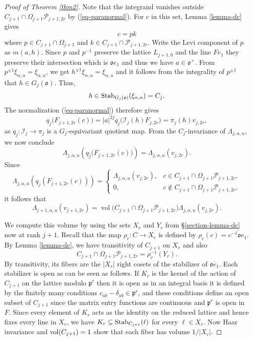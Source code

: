 \documentclass[12pt]{amsart}
\theoremstyle{definition}
\theoremstyle{remark}
\begin{document}
\begin{proof}[Proof of Theorem \ref{thm2}]
Note that the integrand vanishes outside 
$C_{j+1}\cap\Omega_{j+1}\mathcal P_{j+1,2r}$ by (\ref{eq-paranormal}).
For $c$ in this set, Lemma \ref{lemma-dc} gives
\[
c=pk\]
where
$
p\in C_{j+1}\cap\Omega_{j+1}$ and $k\in C_{j+1}\cap\mathcal P_{j+1,2r}$.
Write the Levi component of $p$ as $m(a,h)$. Since $p$ and $p^{-1}$ preserve the lattice $L_{j+1,0}$ and the line $Fe_1$ they preserve their intersection which is $\mathfrak o e_1$ and thus we have $a\in\mathfrak o^\times$. From $p^{\pm 1}\xi_{\alpha,u}=\xi_{\alpha,u}$, we get $h^{\pm 1} \xi_{\alpha,u}=\xi_{\alpha,u}$ and it follows from the integrality of $p^{\pm 1}$ that $h \in G_j(\mathfrak o)$. Thus,
\[
h \in {\rm Stab}_{G_j(\mathfrak o)}(\xi_{\alpha,u})=C_j.
\]
The normalization (\ref{eq-paranormal}) therefore gives
\[
q_j\bigl(F_{j+1,2r}(c)\bigr)
=
|a|^{2j}
q_j\bigl(\mathcal I_j(h)F_{j,2r}\bigr) = \pi_j(h)v_{j,2r},
\]
as $q_j:\mathcal I_j\to\pi_j$ is a $G_j$-equivariant quotient map.
From the $C_j$-invariance of $\Lambda_{j,\alpha,u}$, we now conclude 
\[
\Lambda_{j,\alpha,u}\!\left(
q_j\bigl(F_{j+1,2r}(c)\bigr)
\right)
=
\Lambda_{j,\alpha,u}(v_{j,2r}).
\]
Since 
\[
\Lambda_{j,\alpha,u}\!\left(q_j(F_{j+1,2r}(c))\right)
=
\begin{cases}
\Lambda_{j,\alpha,u}(v_{j,2r}),&c\in C_{j+1}\cap\Omega_{j+1}\mathcal P_{j+1,2r},\\
0,&c\notin C_{j+1}\cap\Omega_{j+1}\mathcal P_{j+1,2r},
\end{cases}
\]
it follows that
\begin{equation}\label{eq-parallel}
\Lambda_{j+1,\alpha,u}(v_{j+1,2r})
=
\operatorname{vol}\bigl(
C_{j+1}\cap\Omega_{j+1}\mathcal P_{j+1,2r}
\bigr)
\Lambda_{j,\alpha,u}(v_{j,2r}).
\end{equation}

We compute this volume by using the sets $X_r$ and $Y_r$ from \S \ref{section-lemma-dc} now at rank $j+1$. Recall that the map $\rho_r:C \rightarrow X_r$ is defined by $
\rho_r(c)=\overline{c^{-1}\mathfrak o e_1}$.
By Lemma \ref{lemma-dc}, we have transitivity of $C_{j+1}$ on $X_r$ and also
\[
C_{j+1}\cap\Omega_{j+1}\mathcal P_{j+1,2r}
=
\rho_r^{-1}(Y_r).
\]
By transitivity, its fibers are the $|X_r|$ right cosets of the stabilizer of $\overline{\mathfrak oe_1}$. Each stabilizer is open as can be seen as follows. If $K_r$ is the kernel of the action of $C_{j+1}$ on the lattice modulo $\mathfrak p^r$ then it is open as in an integral basis it is defined by the finitely many conditions $c_{ab}-\delta_{ab}\in\mathfrak p^r$, 
and these conditions define an open subset of $C_{j+1}$ since the matrix entry functions are continuous and $\mathfrak p^r$ is open in $F$. Since every element of $K_r$ acts as the identity on the reduced lattice and hence fixes every line in $X_r$, we have $K_r\subseteq {\rm Stab}_{C_{j+1}}(\ell)$ for every $\ell \in X_r$. Now Haar invariance and ${\rm vol}(C_{j+1})=1$ show that each fiber has volume $1/|X_r|$.


\end{proof}
\end{document}
